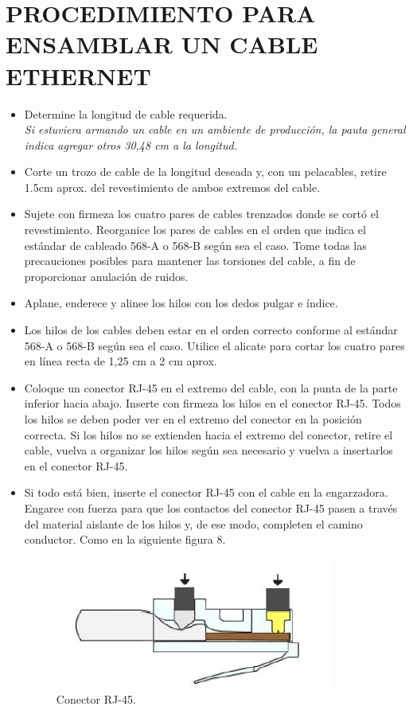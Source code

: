 \documentclass[journal]{IEEEtran}
\begin{document}
\section{PROCEDIMIENTO PARA ENSAMBLAR UN CABLE ETHERNET}

\begin{itemize}
	\item Determine la longitud de cable requerida.\\
	\textit{Si estuviera armando un cable en un ambiente de producción, la pauta general indica agregar otros 30,48 cm a la longitud.}
	\item Corte un trozo de cable de la longitud deseada y, con un pelacables, retire 1.5cm aprox. del revestimiento de ambos extremos del cable.
	\item Sujete con firmeza los cuatro pares de cables trenzados donde se cortó el revestimiento. Reorganice los pares de cables en el orden que indica el estándar de cableado 568-A o 568-B según sea el caso. Tome todas las precauciones posibles para mantener las torsiones del cable, a fin de proporcionar anulación de ruidos.
	\item Aplane, enderece y alinee los hilos con los dedos pulgar e índice.
	\item Los hilos de los cables deben estar en el orden correcto conforme al estándar 568-A o 568-B según sea el caso. Utilice el alicate para cortar los cuatro pares en línea recta de 1,25 cm a 2 cm aprox.
	\item Coloque un conector RJ-45 en el extremo del cable, con la punta de la parte inferior hacia abajo. Inserte con firmeza los hilos en el conector RJ-45. Todos los hilos se deben poder ver en el extremo del conector en la posición correcta. Si los hilos no se extienden hacia el extremo del conector, retire el cable, vuelva a organizar los hilos según sea necesario y vuelva a insertarlos en el conector RJ-45.
	\item Si todo está bien, inserte el conector RJ-45 con el cable en la engarzadora. Engarce con fuerza para que los contactos del conector RJ-45 pasen a través del material aislante de los hilos y, de ese modo, completen el camino conductor. Como en la siguiente figura 8.
		\begin{figure}[ht]
			\centering
			\includegraphics[scale=0.75]{8.JPG} 
			\caption{Conector RJ-45.}
		\end{figure}


\end{itemize}
\end{document}
